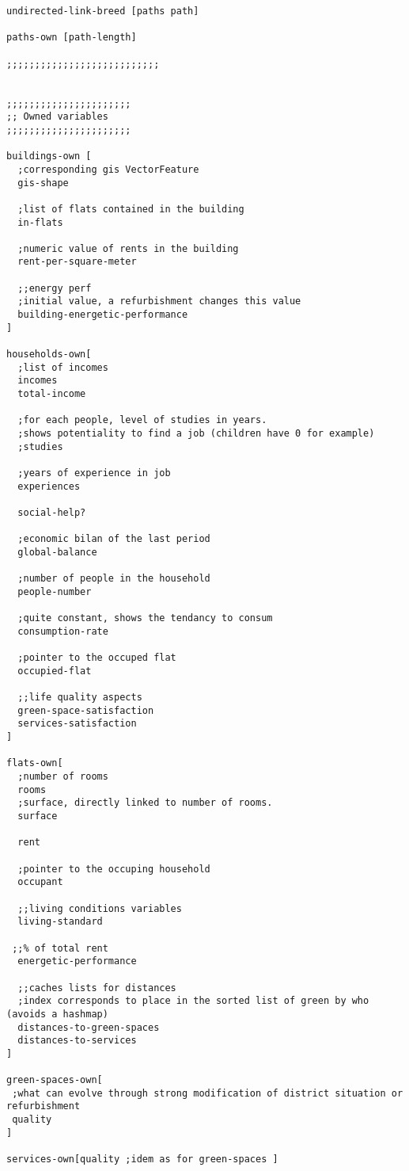 \documentclass[english]{article}
\begin{document}
\begin{lstlisting}[basicstyle={\scriptsize}]
undirected-link-breed [paths path]

paths-own [path-length]

;;;;;;;;;;;;;;;;;;;;;;;;;;;


;;;;;;;;;;;;;;;;;;;;;;
;; Owned variables
;;;;;;;;;;;;;;;;;;;;;;

buildings-own [
  ;corresponding gis VectorFeature
  gis-shape

  ;list of flats contained in the building
  in-flats

  ;numeric value of rents in the building
  rent-per-square-meter

  ;;energy perf 
  ;initial value, a refurbishment changes this value
  building-energetic-performance
]

households-own[
  ;list of incomes
  incomes
  total-income

  ;for each people, level of studies in years.
  ;shows potentiality to find a job (children have 0 for example)
  ;studies

  ;years of experience in job
  experiences

  social-help? 
  
  ;economic bilan of the last period
  global-balance

  ;number of people in the household
  people-number

  ;quite constant, shows the tendancy to consum
  consumption-rate

  ;pointer to the occuped flat
  occupied-flat
    
  ;;life quality aspects
  green-space-satisfaction
  services-satisfaction
]

flats-own[
  ;number of rooms
  rooms
  ;surface, directly linked to number of rooms.
  surface

  rent

  ;pointer to the occuping household
  occupant

  ;;living conditions variables
  living-standard

 ;;% of total rent
  energetic-performance

  ;;caches lists for distances
  ;index corresponds to place in the sorted list of green by who (avoids a hashmap)
  distances-to-green-spaces
  distances-to-services
]

green-spaces-own[
 ;what can evolve through strong modification of district situation or refurbishment
 quality
]

services-own[quality ;idem as for green-spaces ]


\end{lstlisting}
\end{document}

